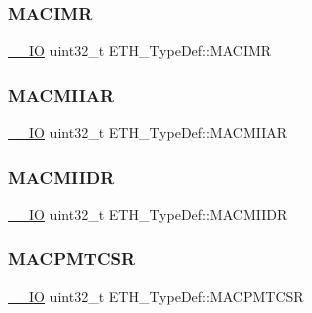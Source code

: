 \mbox{\label{struct_e_t_h___type_def_a45d413bc59caf6c14eb230266d7ab8c3}} 
\subsubsection{\texorpdfstring{MACIMR}{MACIMR}}
{\footnotesize\ttfamily \mbox{\hyperlink{group___c_m_s_i_s___c_m3__core__definitions_gaec43007d9998a0a0e01faede4133d6be}{\+\_\+\+\_\+\+IO}} uint32\+\_\+t E\+T\+H\+\_\+\+Type\+Def\+::\+M\+A\+C\+I\+MR}

\mbox{\label{struct_e_t_h___type_def_af697fcc940139f7dcb483766420852be}} 
\subsubsection{\texorpdfstring{MACMIIAR}{MACMIIAR}}
{\footnotesize\ttfamily \mbox{\hyperlink{group___c_m_s_i_s___c_m3__core__definitions_gaec43007d9998a0a0e01faede4133d6be}{\+\_\+\+\_\+\+IO}} uint32\+\_\+t E\+T\+H\+\_\+\+Type\+Def\+::\+M\+A\+C\+M\+I\+I\+AR}

\mbox{\label{struct_e_t_h___type_def_a3d4c60bb689285b937c939b36a1233a3}} 
\subsubsection{\texorpdfstring{MACMIIDR}{MACMIIDR}}
{\footnotesize\ttfamily \mbox{\hyperlink{group___c_m_s_i_s___c_m3__core__definitions_gaec43007d9998a0a0e01faede4133d6be}{\+\_\+\+\_\+\+IO}} uint32\+\_\+t E\+T\+H\+\_\+\+Type\+Def\+::\+M\+A\+C\+M\+I\+I\+DR}

\mbox{\label{struct_e_t_h___type_def_a1deaafa44dbc3c8a2daaaf317dee5624}} 
\subsubsection{\texorpdfstring{MACPMTCSR}{MACPMTCSR}}
{\footnotesize\ttfamily \mbox{\hyperlink{group___c_m_s_i_s___c_m3__core__definitions_gaec43007d9998a0a0e01faede4133d6be}{\+\_\+\+\_\+\+IO}} uint32\+\_\+t E\+T\+H\+\_\+\+Type\+Def\+::\+M\+A\+C\+P\+M\+T\+C\+SR}

